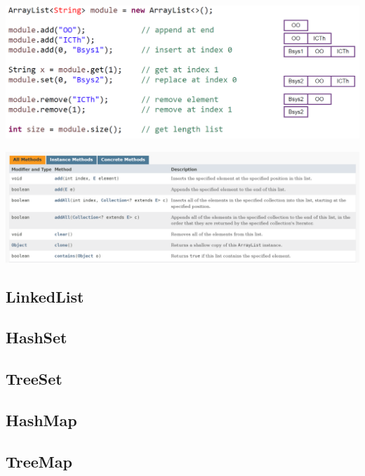 \begin{center}
    \includegraphics[width=0.9\columnwidth]{pictures/arrayList-bsp.png}
\end{center}

\begin{center}
    \includegraphics[width=0.9\columnwidth]{pictures/arrayList-api.png}
\end{center}

\subsection{LinkedList}

\subsection{HashSet}

\subsection{TreeSet}

\subsection{HashMap}

\subsection{TreeMap}
